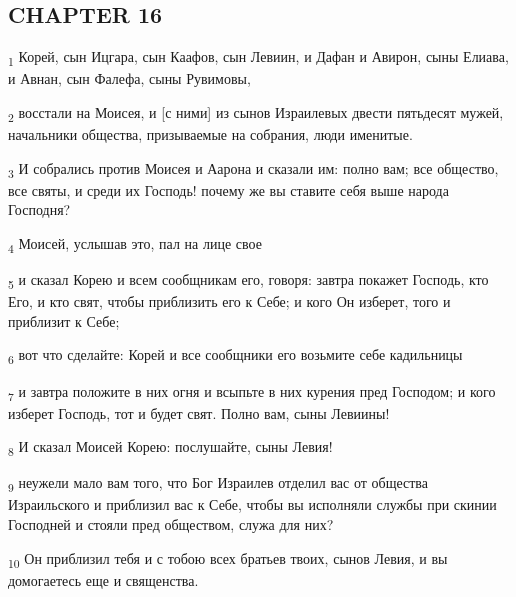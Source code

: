 \subsection{CHAPTER 16}
\begin{tcolorbox}
\textsubscript{1} Корей, сын Ицгара, сын Каафов, сын Левиин, и Дафан и Авирон, сыны Елиава, и Авнан, сын Фалефа, сыны Рувимовы,
\end{tcolorbox}
\begin{tcolorbox}
\textsubscript{2} восстали на Моисея, и [с ними] из сынов Израилевых двести пятьдесят мужей, начальники общества, призываемые на собрания, люди именитые.
\end{tcolorbox}
\begin{tcolorbox}
\textsubscript{3} И собрались против Моисея и Аарона и сказали им: полно вам; все общество, все святы, и среди их Господь! почему же вы ставите себя выше народа Господня?
\end{tcolorbox}
\begin{tcolorbox}
\textsubscript{4} Моисей, услышав это, пал на лице свое
\end{tcolorbox}
\begin{tcolorbox}
\textsubscript{5} и сказал Корею и всем сообщникам его, говоря: завтра покажет Господь, кто Его, и кто свят, чтобы приблизить его к Себе; и кого Он изберет, того и приблизит к Себе;
\end{tcolorbox}
\begin{tcolorbox}
\textsubscript{6} вот что сделайте: Корей и все сообщники его возьмите себе кадильницы
\end{tcolorbox}
\begin{tcolorbox}
\textsubscript{7} и завтра положите в них огня и всыпьте в них курения пред Господом; и кого изберет Господь, тот и будет свят. Полно вам, сыны Левиины!
\end{tcolorbox}
\begin{tcolorbox}
\textsubscript{8} И сказал Моисей Корею: послушайте, сыны Левия!
\end{tcolorbox}
\begin{tcolorbox}
\textsubscript{9} неужели мало вам того, что Бог Израилев отделил вас от общества Израильского и приблизил вас к Себе, чтобы вы исполняли службы при скинии Господней и стояли пред обществом, служа для них?
\end{tcolorbox}
\begin{tcolorbox}
\textsubscript{10} Он приблизил тебя и с тобою всех братьев твоих, сынов Левия, и вы домогаетесь еще и священства.
\end{tcolorbox}
